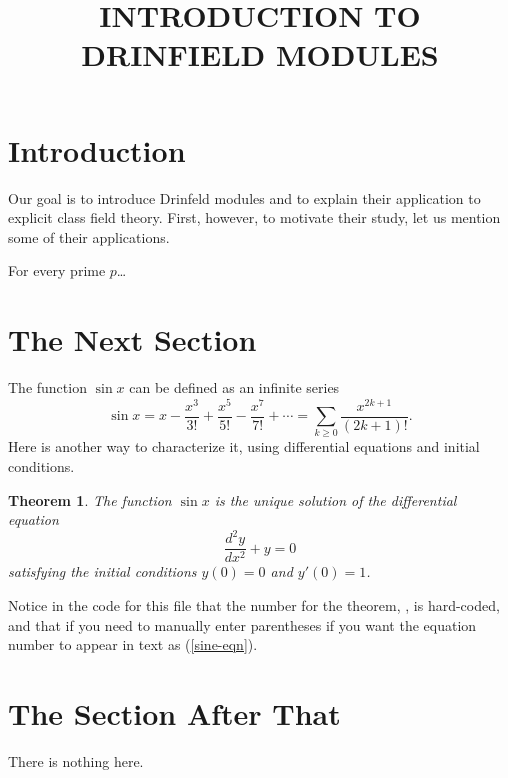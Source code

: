\documentclass{scrartcl}
\title{INTRODUCTION TO DRINFIELD MODULES}
\theoremstyle{plain}
\newtheorem{theorem}{Theorem}[section]
\theoremstyle{definition}
\begin{document}
\maketitle

\section{Introduction}
Our goal is to introduce Drinfeld modules and to explain their application to explicit class
field theory. First, however, to motivate their study, let us mention some of their applications.

\begin{styledtheorem}[Euclid]
    For every prime $p$\dots
    \end{styledtheorem}

\section{The Next Section}\label{sec1}
The function $\sin x$ can be defined as an infinite series
\begin{equation}\label{sineseries}
\sin x = x - \frac{x^3}{3!} + \frac{x^5}{5!} - \frac{x^7}{7!} + \cdots = \sum_{k \geq 0} \frac{x^{2k+1}}{(2k+1)!}.
\end{equation}
Here is another way to characterize it, using differential equations and initial conditions.

\begin{theorem}\label{diffthm}
The function $\sin x$ is the unique solution of the differential equation
\begin{equation}\label{sine-eqn}
\frac{d^2y}{dx^2} + y = 0
\end{equation}
satisfying the initial conditions $y(0) = 0$ and $y'(0) = 1$.
\end{theorem}

Notice in the code for this file that the number for the theorem, , is hard-coded, and that 
if you need to manually enter parentheses if you want the equation number to appear in text as (\ref{sine-eqn}).


\section{The Section After That}\label{sec2}

There is nothing here.
\end{document}
